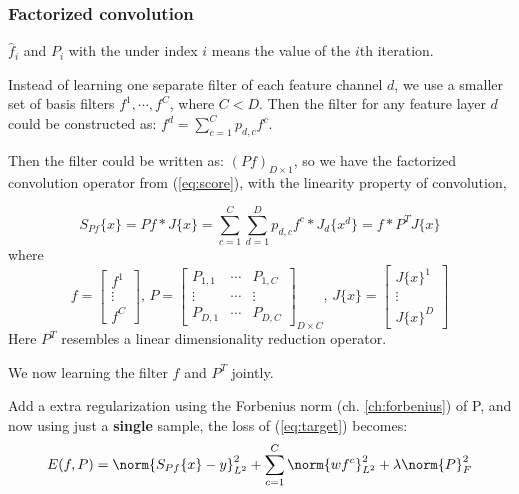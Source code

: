 \documentclass[12pt]{article}
\numberwithin{equation}{section}
\begin{document}
\subsubsection{Factorized convolution}
$\hat{f}_i$ and $P_i$ with the under index $i$ means the value of the $i$th iteration. \par
Instead of learning one separate filter of each feature channel $d$, we use a smaller set of basis filters 
$f^1, \cdots, f^C$, where $C < D$. Then the filter for any feature layer $d$ could be constructed as: 
$f^d = \sum^C_{c=1} p_{d,c}f^c$. \par
Then the filter could be written as: $(Pf)_{D \times 1}$, so we have 
the factorized convolution operator from (\ref{eq:score}), with the linearity property of convolution, \par
\begin{equation}
	S_{Pf}\{x\}= Pf*J\{x\}=\sum^C_{c=1} \sum^D_{d=1} p_{d,c} f^c * J_d\{x^d\} = f*P^TJ\{x\}
\end{equation} 
where 
\begin{equation}
	f = 
	\begin{bmatrix}
		f^1 \\ \vdots \\ f^C
	\end{bmatrix}
	\text{, }
	P = 
	\begin{bmatrix}
		P_{1,1} & \cdots & P_{1,C} \\
		\vdots & \cdots & \vdots \\
		P_{D,1} & \cdots & P_{D,C} 
	\end{bmatrix}_{D \times C}
	\text{, }
	J\{x\} = 
	\begin{bmatrix}
		J\{x\}^1 \\ \vdots \\ J\{x\}^D
	\end{bmatrix}
\end{equation}
Here $P^T$ resembles a linear dimensionality reduction operator. \par
We now learning the filter $f$ and $P^T$ jointly. \par
Add a extra regularization using the Forbenius norm (ch. \ref{ch:forbenius}) of P, and now using just a \textbf{single} sample, the loss of (\ref{eq:target}) becomes: 
\begin{equation} \label{eq:targetFactorized}
	E(f, P)=\norm{S_{Pf}\{x\}-y}^2_{L^2}
		 + \sum^C_{c=1} \norm{w f^c}^2_{L^2}
		 + \lambda \norm{P}^2_F
\end{equation} \par
\end{document}
